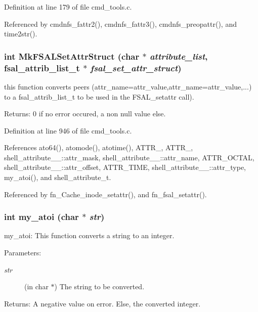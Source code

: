 Definition at line 179 of file cmd\_\-tools.c.

Referenced by cmdnfs\_\-fattr2(), cmdnfs\_\-fattr3(), cmdnfs\_\-preopattr(), and time2str().
\subsubsection{\setlength{\rightskip}{0pt plus 5cm}int Mk\-FSALSet\-Attr\-Struct (char $\ast$ {\em attribute\_\-list}, fsal\_\-attrib\_\-list\_\-t $\ast$ {\em fsal\_\-set\_\-attr\_\-struct})}\label{cmd__tools_8c_a18}


this function converts peers (attr\_\-name=attr\_\-value,attr\_\-name=attr\_\-value,...) to a fsal\_\-attrib\_\-list\_\-t to be used in the FSAL\_\-setattr call). \begin{Desc}
\item[Returns:]0 if no error occured, a non null value else. \end{Desc}


Definition at line 946 of file cmd\_\-tools.c.

References ato64(), atomode(), atotime(), ATTR\_, ATTR\_, shell\_\-attribute\_\-\_\-::attr\_\-mask, shell\_\-attribute\_\-\_\-::attr\_\-name, ATTR\_\-OCTAL, shell\_\-attribute\_\-\_\-::attr\_\-offset, ATTR\_\-TIME, shell\_\-attribute\_\-\_\-::attr\_\-type, my\_\-atoi(), and shell\_\-attribute\_\-t.

Referenced by fn\_\-Cache\_\-inode\_\-setattr(), and fn\_\-fsal\_\-setattr().
\subsubsection{\setlength{\rightskip}{0pt plus 5cm}int my\_\-atoi (char $\ast$ {\em str})}\label{cmd__tools_8c_a6}


my\_\-atoi: This function converts a string to an integer.

\begin{Desc}
\item[Parameters:]
\begin{description}
\item[{\em str}](in char $\ast$) The string to be converted.\end{description}
\end{Desc}
\begin{Desc}
\item[Returns:]A negative value on error. Else, the converted integer. \end{Desc}


